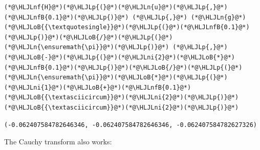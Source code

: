\documentclass[12pt,a4paper]{article}
\newcommand{\HLJLn}[1]{#1}
\newcommand{\HLJLnf}[1]{\textcolor[RGB]{66,102,213}{#1}}
\newcommand{\HLJLnfB}[1]{\textcolor[RGB]{59,151,46}{#1}}
\newcommand{\HLJLni}[1]{\textcolor[RGB]{59,151,46}{#1}}
\newcommand{\HLJLoB}[1]{\textcolor[RGB]{102,102,102}{\textbf{#1}}}
\newcommand{\HLJLp}[1]{#1}
\begin{document}
\begin{lstlisting}
(*@\HLJLnf{H}@*)(*@\HLJLp{(}@*)(*@\HLJLn{u}@*)(*@\HLJLp{,}@*)(*@\HLJLnfB{0.1}@*)(*@\HLJLp{)}@*) (*@\HLJLp{,}@*) (*@\HLJLn{g}@*)(*@\HLJLoB{{\textquotesingle}}@*)(*@\HLJLp{(}@*)(*@\HLJLnfB{0.1}@*)(*@\HLJLp{)}@*)(*@\HLJLoB{/}@*)(*@\HLJLp{(}@*)(*@\HLJLn{\ensuremath{\pi}}@*)(*@\HLJLp{)}@*) (*@\HLJLp{,}@*) (*@\HLJLoB{-}@*)(*@\HLJLp{(}@*)(*@\HLJLni{2}@*)(*@\HLJLoB{*}@*)(*@\HLJLnfB{0.1}@*)(*@\HLJLp{)}@*)(*@\HLJLoB{/}@*)(*@\HLJLp{(}@*)(*@\HLJLn{\ensuremath{\pi}}@*)(*@\HLJLoB{*}@*)(*@\HLJLp{(}@*)(*@\HLJLni{1}@*)(*@\HLJLoB{+}@*)(*@\HLJLnfB{0.1}@*)(*@\HLJLoB{{\textasciicircum}}@*)(*@\HLJLni{2}@*)(*@\HLJLp{)}@*)(*@\HLJLoB{{\textasciicircum}}@*)(*@\HLJLni{2}@*)(*@\HLJLp{)}@*)
\end{lstlisting}

\begin{lstlisting}
(-0.062407584782646346, -0.062407584782646346, -0.062407584782627326)
\end{lstlisting}


The Cauchy transform also works:
\end{document}
